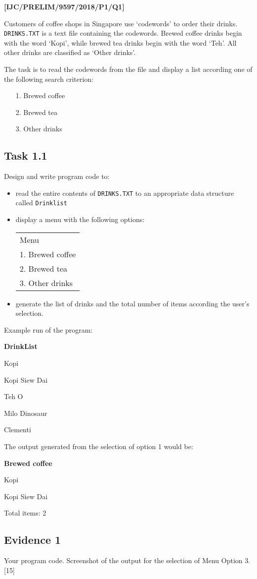 \item \textbf{{[}IJC/PRELIM/9597/2018/P1/Q1{]} }

Customers of coffee shops in Singapore use \textquoteleft codewords\textquoteright{}
to order their drinks. \texttt{DRINKS.TXT} is a text file containing
the codewords. Brewed coffee drinks begin with the word \textquoteleft Kopi\textquoteright ,
while brewed tea drinks begin with the word \textquoteleft Teh\textquoteright .
All other drinks are classified as \textquoteleft Other drinks\textquoteright .

The task is to read the codewords from the file and display a list
according one of the following search criterion:
\begin{enumerate}
\item[1.]  Brewed coffee 
\item[2.]  Brewed tea
\item[3.]  Other drinks
\end{enumerate}

\subsection*{Task 1.1 }

Design and write program code to:
\begin{itemize}
\item read the entire contents of \texttt{DRINKS.TXT} to an appropriate
data structure called \texttt{Drinklist} 
\item display a menu with the following options: 
\noindent \begin{center}
\begin{tabular}{|l|}
\hline 
Menu\tabularnewline
1. Brewed coffee\tabularnewline
2. Brewed tea\tabularnewline
3. Other drinks\tabularnewline
\hline 
\end{tabular}
\par\end{center}
\item \textbullet{} generate the list of drinks and the total number of
items according the user\textquoteright s selection.
\end{itemize}
Example run of the program: 

\textbf{DrinkList} 

Kopi 

Kopi Siew Dai 

Teh O 

Milo Dinosaur 

Clementi 

The output generated from the selection of option 1 would be: 

\textbf{Brewed coffee}

Kopi 

Kopi Siew Dai 

Total items: 2 

\subsection*{Evidence 1 }

Your program code. Screenshot of the output for the selection of Menu
Option 3. \hfill{}{[}15{]}